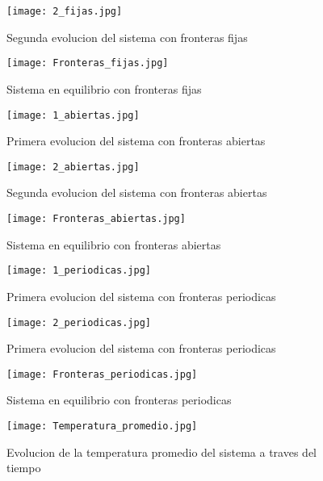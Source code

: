 \documentclass[12pt]{article}
\begin{document}
\begin{figure}[h!]
    \centering
    \texttt{[image: 2\_fijas.jpg]}
    \caption{Segunda evolucion del sistema con fronteras fijas}
    \label{fig5}
\end{figure}


\begin{figure}[h!]
    \centering
    \texttt{[image: Fronteras\_fijas.jpg]}
    \caption{Sistema en equilibrio con fronteras fijas}
    \label{fig12}
\end{figure}



\begin{figure}[h!]
    \centering
    \texttt{[image: 1\_abiertas.jpg]}
    \caption{Primera evolucion del sistema con fronteras abiertas}
    \label{fig6}
\end{figure}


\begin{figure}[h!]
    \centering
    \texttt{[image: 2\_abiertas.jpg]}
    \caption{Segunda evolucion del sistema con fronteras abiertas}
    \label{fig7}
\end{figure}


\begin{figure}[h!]
    \centering
    \texttt{[image: Fronteras\_abiertas.jpg]}
    \caption{Sistema en equilibrio con fronteras abiertas}
    \label{fig8}
\end{figure}


\begin{figure}[h!]
    \centering
    \texttt{[image: 1\_periodicas.jpg]}
    \caption{Primera evolucion del sistema con fronteras periodicas}
    \label{fig9}
\end{figure}


\begin{figure}[h!]
    \centering
    \texttt{[image: 2\_periodicas.jpg]}
    \caption{Primera evolucion del sistema con fronteras periodicas}
    \label{fig10}
\end{figure}

\begin{figure}[h!]
    \centering
    \texttt{[image: Fronteras\_periodicas.jpg]}
    \caption{Sistema en equilibrio con fronteras periodicas}
    \label{fig11}
\end{figure}


\begin{figure}[h!]
    \centering
    \texttt{[image: Temperatura\_promedio.jpg]}
    \caption{Evolucion de la temperatura promedio del sistema a traves del tiempo}
    \label{fig13}
\end{figure}
\end{document}
